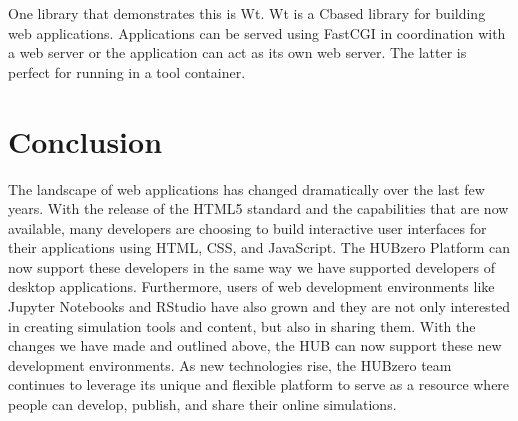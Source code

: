 \documentclass[conference]{../sty/IEEEtran}
\newcommand\CC{C\nolinebreak[4]\hspace{-.05em}\raisebox{.4ex}{\relsize{-3}{\textbf{++}}}\hspace{.25em}}
\begin{document}
One library that
demonstrates this is Wt\cite{wt}. Wt is a \CC based library for building web
applications. Applications can be served using FastCGI in coordination with a
web server or the application can act as its own web server. The latter is
perfect for running in a tool container.




\section{Conclusion}
The landscape of web applications has changed dramatically over the last few
years. With the release of the HTML5 standard and the capabilities that are now
available, many developers are choosing to build interactive user interfaces
for their applications using HTML, CSS, and JavaScript. The HUBzero Platform
can now support these developers in the same way we have supported developers of
desktop applications. Furthermore, users of web development environments
like Jupyter Notebooks and RStudio have also grown and they are not only
interested in creating simulation tools and content, but also in sharing them.
With the changes we have made and outlined above, the HUB can now support these
new development environments.  As new technologies rise, the HUBzero team
continues to leverage its unique and flexible platform to serve as a resource
where people can develop, publish, and share their online simulations.





\end{document}

